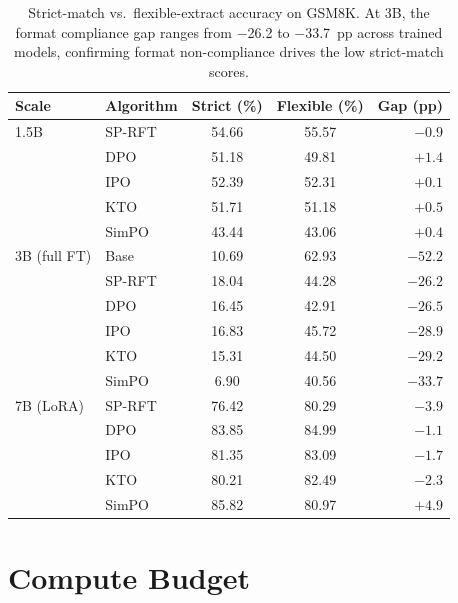 \documentclass{article}
\newcommand{\sprft}{SP-RFT}
\begin{document}
\begin{table}[ht]
\centering
\caption{Strict-match vs.\ flexible-extract accuracy on GSM8K. At 3B, the format compliance gap ranges from $-$26.2 to $-$33.7~pp across trained models, confirming format non-compliance drives the low strict-match scores.}
\label{tab:format_gap}
\small
\begin{tabular}{@{}llccr@{}}
\toprule
\textbf{Scale} & \textbf{Algorithm} & \textbf{Strict (\%)} & \textbf{Flexible (\%)} & \textbf{Gap (pp)} \\
\midrule
1.5B & \sprft{} & 54.66 & 55.57 & $-0.9$ \\
& DPO & 51.18 & 49.81 & $+1.4$ \\
& IPO & 52.39 & 52.31 & $+0.1$ \\
& KTO & 51.71 & 51.18 & $+0.5$ \\
& SimPO & 43.44 & 43.06 & $+0.4$ \\
\midrule
3B (full FT) & Base & 10.69 & 62.93 & $-52.2$ \\
 & \sprft{} & 18.04 & 44.28 & $-26.2$ \\
 & DPO & 16.45 & 42.91 & $-26.5$ \\
 & IPO & 16.83 & 45.72 & $-28.9$ \\
 & KTO & 15.31 & 44.50 & $-29.2$ \\
 & SimPO & 6.90 & 40.56 & $-33.7$ \\
\midrule
7B (LoRA) & \sprft{} & 76.42 & 80.29 & $-3.9$ \\
& DPO & 83.85 & 84.99 & $-1.1$ \\
& IPO & 81.35 & 83.09 & $-1.7$ \\
& KTO & 80.21 & 82.49 & $-2.3$ \\
& SimPO & 85.82 & 80.97 & $+4.9$ \\
\bottomrule
\end{tabular}
\end{table}

\section{Compute Budget}
\label{app:compute}
\end{document}
